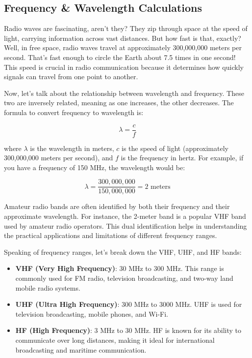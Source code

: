 \subsection{Frequency \& Wavelength Calculations}
\label{subsec:freq-wavelength}

Radio waves are fascinating, aren't they? They zip through space at the speed of light, carrying information across vast distances. But how fast is that, exactly? Well, in free space, radio waves travel at approximately 300,000,000 meters per second. That's fast enough to circle the Earth about 7.5 times in one second! This speed is crucial in radio communication because it determines how quickly signals can travel from one point to another.

Now, let's talk about the relationship between wavelength and frequency. These two are inversely related, meaning as one increases, the other decreases. The formula to convert frequency to wavelength is:

\begin{equation}
\lambda = \frac{c}{f}
\label{eq:wavelength}
\end{equation}

where \(\lambda\) is the wavelength in meters, \(c\) is the speed of light (approximately 300,000,000 meters per second), and \(f\) is the frequency in hertz. For example, if you have a frequency of 150 MHz, the wavelength would be:

\[
\lambda = \frac{300,000,000}{150,000,000} = 2 \text{ meters}
\]

Amateur radio bands are often identified by both their frequency and their approximate wavelength. For instance, the 2-meter band is a popular VHF band used by amateur radio operators. This dual identification helps in understanding the practical applications and limitations of different frequency ranges.

Speaking of frequency ranges, let's break down the VHF, UHF, and HF bands:

\begin{itemize}[noitemsep]    \item \textbf{VHF (Very High Frequency)}: 30 MHz to 300 MHz. This range is commonly used for FM radio, television broadcasting, and two-way land mobile radio systems.
    \item \textbf{UHF (Ultra High Frequency)}: 300 MHz to 3000 MHz. UHF is used for television broadcasting, mobile phones, and Wi-Fi.
    \item \textbf{HF (High Frequency)}: 3 MHz to 30 MHz. HF is known for its ability to communicate over long distances, making it ideal for international broadcasting and maritime communication.
\end{itemize}

